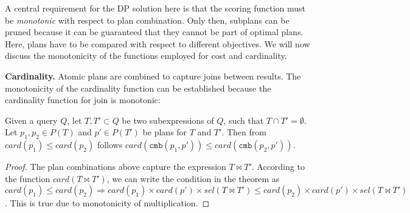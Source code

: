 
A central requirement for the DP solution here is that the scoring function must be \emph{monotonic} with respect to plan combination. 
Only then, subplans can be pruned because it can be guaranteed that they cannot be part of optimal plans. Here, plans have to be compared with respect to different objectives. We will now discuss the monotonicity of the functions employed for cost and cardinality. 

\textbf{Cardinality.} Atomic plans are combined to capture joins between results. The monotonicity of the cardinality function can be established because the cardinality function for join is monotonic:

\begin{theorem}
  Given a query $Q$, let $T,T' \subset Q$ be two subexpressions of
  $Q$, such that $T \cap T' = \emptyset$. Let $p_1,p_2 \in P(T)$ and
  $p' \in P(T')$ be plans for $T$ and $T'$. Then from $card(p_1) \leq
  card(p_2)$ follows $card(\mathtt{cmb}(p_1,p')) \leq
  card(\mathtt{cmb}(p_2,p'))$.
\end{theorem}
\begin{proof}
  The plan combinations above capture the expression $T \Join T'$. According to the function $card(T \Join T')$, we can write the condition in
  the theorem as $card(p_1) \leq card(p_2) \Rightarrow card(p_1)
  \times card(p') \times sel(T \Join T') \leq card(p_2) \times card(p') \times
  sel(T \Join T')$. This is true due to monotonicity of multiplication.
\end{proof}

